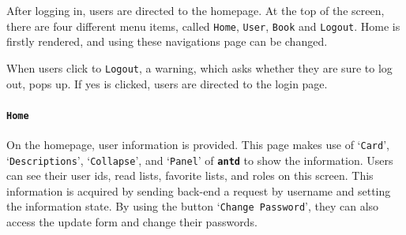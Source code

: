 After logging in, users are directed to the homepage. At the top of the screen, there are four different menu items, called \texttt{Home}, \texttt{User}, \texttt{Book} and \texttt{Logout}. Home is firstly rendered, and using these navigations page can be changed.

When users click to \texttt{Logout}, a warning, which asks whether they are sure to log out, pops up. If yes is clicked, users are directed to the login page.

\paragraph{\texttt{Home}}

On the homepage, user information is provided. This page makes use of `\texttt{Card}', `\texttt{Descriptions}', `\texttt{Collapse}', and `\texttt{Panel}' of \textbf{\texttt{antd}} to show the information. Users can see their user ids, read lists, favorite lists, and roles on this screen. This information is acquired by sending back-end a request by username and setting the information state. By using the button `\texttt{Change Password}', they can also access the update form and change their passwords.

